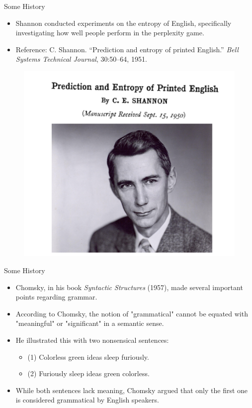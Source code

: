 \documentclass[handout]{beamer}
\begin{document}
\begin{frame}{Some History}
    \scriptsize
    \begin{itemize}
        \item Shannon conducted experiments on the entropy of English, specifically investigating how well people perform in the perplexity game.
        \item Reference: C. Shannon. ``Prediction and entropy of printed English.'' \textit{Bell Systems Technical Journal}, 30:50–64, 1951. \cite{shannon1951prediction}
    \end{itemize}
    
    
 \begin{figure}[h]
        	\includegraphics[scale = 0.4]{pics/shannon.png}
        \end{figure}  
    
\end{frame}

\begin{frame}{Some History}
    \scriptsize
    \begin{itemize}
        \item Chomsky, in his book \textit{Syntactic Structures} (1957), made several important points regarding grammar. \cite{chomsky2009syntactic}
        \item According to Chomsky, the notion of "grammatical" cannot be equated with "meaningful" or "significant" in a semantic sense.
        \item He illustrated this with two nonsensical sentences:
        \begin{itemize}
            \scriptsize
            \item (1) Colorless green ideas sleep furiously.
            \item (2) Furiously sleep ideas green colorless.
        \end{itemize}
        \item While both sentences lack meaning, Chomsky argued that only the first one is considered grammatical by English speakers.
         \end{itemize}
\end{frame}
\end{document}
